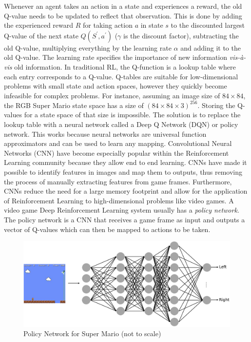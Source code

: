 \documentclass[notitlepage,a4paper,11pt]{article}
\begin{document}
Whenever an agent takes an action in a state and experiences a reward, the old Q-value needs to be updated to reflect that observation. This is done by adding the experienced reward $R$ for taking action $a$ in state $s$ to the discounted largest Q-value of the next state $Q(S^\prime, a^\prime)$ ($\gamma$ is the discount factor), subtracting the old Q-value, multiplying everything by the learning rate $\alpha$ and adding it to the old Q-value. The learning rate specifies the importance of new information \textit{vis-à-vis} old information. In traditional RL, the Q-function is a lookup table where each entry corresponds to a Q-value. Q-tables are suitable for low-dimensional problems with small state and action spaces, however they quickly become infeasible for complex problems. For instance, assuming an image size of $84 \times 84$, the RGB Super Mario state space has a size of $(84 \times 84 \times 3)^{256}$. Storing the Q-values for a state space of that size is impossible. The solution is to replace the lookup table with a neural network called a Deep Q Network (DQN) or policy network. This works because neural networks are universal function approximators and can be used to learn any mapping. Convolutional Neural Networks (CNN) have become especially popular within the Reinforcement Learning community because they allow end to end learning. CNNs have made it possible to identify features in images and map them to outputs, thus removing the process of manually extracting features from game frames. Furthermore, CNNs reduce the need for a large memory footprint and allow for the application of Reinforcement Learning to high-dimensional problems like video games. A video game Deep Reinforcement Learning system usually has a \textit{policy network}. The policy network is a CNN that receives a game frame as input and outputs a vector of Q-values which can then be mapped to actions to be taken.

\begin{figure}[!htb]
\centering
\includegraphics[trim={0 2cm 0 2cm},clip,width=.75\linewidth]{figs/deep_rl_video_game.eps}
\caption{Policy Network for Super Mario (not to scale)} \label{fig:2}
\end{figure}
\end{document}

